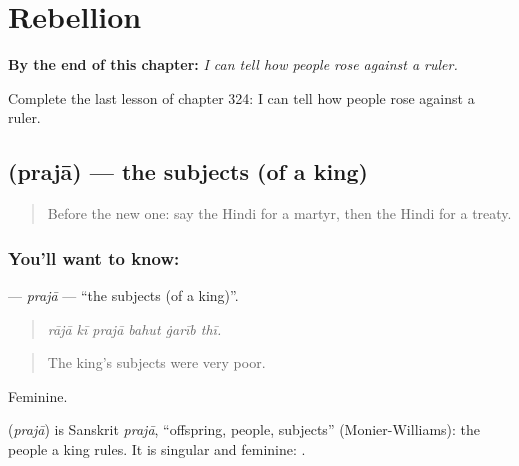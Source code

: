
\chapter{Rebellion}
\label{ch:hi-rebellion}

\begin{chapteropening}
\textbf{By the end of this chapter:} \emph{I can tell how people rose against a ruler.}

Complete the last lesson of chapter 324: I can tell how people rose against a ruler.
\end{chapteropening}

\section[\texorpdfstring{\hi{प्रजा} (prajā)}{प्रजा (prajā)}]{ (prajā) — the subjects (of a king)}

\label{lesson:HI-C324-praja}



\begin{quote}
Before the new one: say the Hindi for a martyr, then the Hindi for a treaty.
\end{quote}

\subsection*{You'll want to know: }
\textbf{} — \emph{prajā} — \textquotedblleft{}the subjects (of a king)\textquotedblright{}.

\begin{quote}
     
\end{quote}

\begin{quote}
\emph{rājā kī prajā bahut ġarīb thī.}
\end{quote}

\begin{quote}
The king's subjects were very poor.
\end{quote}

Feminine.

\begin{cousinweb}
\textbf{} (\emph{prajā}) is Sanskrit \emph{prajā}, \textquotedblleft{}offspring, people, subjects\textquotedblright{} (Monier-Williams): the people a king rules. It is singular and feminine: \textbf{  }.
\end{cousinweb}

